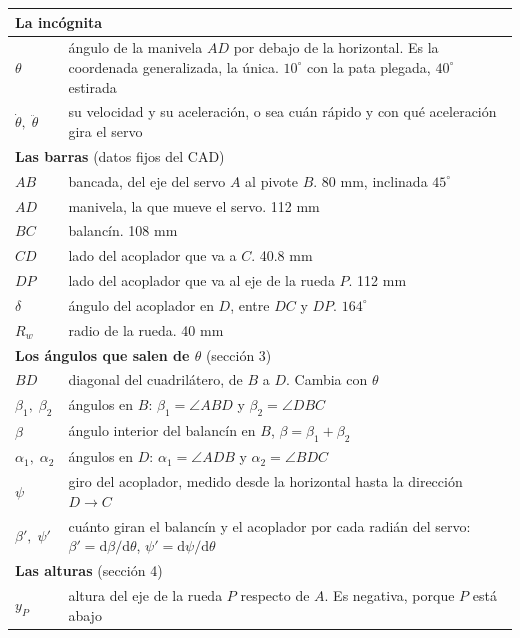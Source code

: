 \documentclass[11pt,a4paper]{article}
\newcommand{\dd}{\mathrm{d}}
\begin{document}
{\small\setlength{\tabcolsep}{5pt}
\begin{longtable}{l p{11.4cm}}
\toprule
\multicolumn{2}{l}{\textbf{La incógnita}}\\
\midrule
\(\theta\) & ángulo de la manivela \(AD\) por debajo de la horizontal. Es la coordenada generalizada, la única.
  \(10^\circ\) con la pata plegada, \(40^\circ\) estirada \\
\(\dot\theta,\;\ddot\theta\) & su velocidad y su aceleración, o sea cuán rápido y con qué aceleración gira el servo \\
\midrule
\multicolumn{2}{l}{\textbf{Las barras} (datos fijos del CAD)}\\
\midrule
\(AB\) & bancada, del eje del servo \(A\) al pivote \(B\). 80 mm, inclinada \(45^\circ\) \\
\(AD\) & manivela, la que mueve el servo. 112 mm \\
\(BC\) & balancín. 108 mm \\
\(CD\) & lado del acoplador que va a \(C\). 40.8 mm \\
\(DP\) & lado del acoplador que va al eje de la rueda \(P\). 112 mm \\
\(\delta\) & ángulo del acoplador en \(D\), entre \(DC\) y \(DP\). \(164^\circ\) \\
\(R_w\) & radio de la rueda. 40 mm \\
\midrule
\multicolumn{2}{l}{\textbf{Los ángulos que salen de \(\theta\)} (sección 3)}\\
\midrule
\(BD\) & diagonal del cuadrilátero, de \(B\) a \(D\). Cambia con \(\theta\) \\
\(\beta_1,\;\beta_2\) & ángulos en \(B\): \(\beta_1=\angle ABD\) y \(\beta_2=\angle DBC\) \\
\(\beta\) & ángulo interior del balancín en \(B\), \(\beta=\beta_1+\beta_2\) \\
\(\alpha_1,\;\alpha_2\) & ángulos en \(D\): \(\alpha_1=\angle ADB\) y \(\alpha_2=\angle BDC\) \\
\(\psi\) & giro del acoplador, medido desde la horizontal hasta la dirección \(D\!\to\!C\) \\
\(\beta',\;\psi'\) & cuánto giran el balancín y el acoplador por cada radián del servo: \(\beta'=\dd\beta/\dd\theta\),
  \(\psi'=\dd\psi/\dd\theta\) \\
\midrule
\multicolumn{2}{l}{\textbf{Las alturas} (sección 4)}\\
\midrule
\(y_P\) & altura del eje de la rueda \(P\) respecto de \(A\). Es negativa, porque \(P\) está abajo \\

\end{longtable}}
\end{document}
